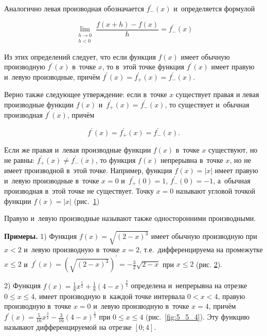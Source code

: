 Аналогично левая производная обозначается $f^\prime_{-}(x)$ и~определяется формулой

\begin{equation*}
\displaystyle \lim_{\substack{h \to 0 \\ h < 0}} \frac{f(x+h) - f(x)}{h} = f^\prime_{-}(x)
\end{equation*}

Из этих определений следует, что если функция $f(x)$ имеет обычную производную
$f^\prime (x)$ в~точке $x$, то в~этой точке функция $f^\prime (x)$ имеет
правую и~левую производные, причём $f^\prime(x) = f^\prime_{+} (x) = f^\prime_{-}(x)$.

Верно также следующее утверждение: если в~точке $x$ существует
правая и левая производные функции $f(x)$ и~$f^\prime_{+} (x) = f^\prime_{-} (x)$,
то существует и~обычная производная $f^\prime (x)$, причём 

\begin{equation*}
f^\prime(x) = f^\prime_{+} (x) = f^\prime_{-}(x).
\end{equation*}

Если же правая и~левая производные функции $f(x)$ в~точке $x$ существуют,
но не равны: $f^\prime_{+} (x) \ne f^\prime_{-}(x)$, то функция $f(x)$ непрерывна
в~точке $x$, но не имеет производной в~этой точке.
Например, функция $f(x) = |x|$ имеет правую и~левую производные в~точке $x = 0$
и~$f^\prime_{+} (0) = 1$, $f^\prime_{-} (0) = -1$, а~обычная производная
в~этой точке не существует. Точку $x = 0$ называют угловой точкой функции
$f(x) = |x|$ (рис.\ \ref{fig:5_5_2})

\begin{figure}\label{fig:5_5_2}
\end{figure}

Правую и~левую производные называют также односторонними производными.

\textbf{Примеры.}
1) Функция $f(x) = \sqrt{(2 - x)^{3}}$ имеет обычную производную при $x < 2$
и~левую производную в~точке $x = 2$, т.е.\ дифференцируема на промежутке $x \leqslant 2$
и~$\displaystyle f^\prime (x) = \left( \sqrt{(2-x)^{3}} \right)^\prime = -\frac{3}{2}\sqrt{2 - x}$
при $x \leqslant 2$ (рис. \ref{fig:5_5_3}).

\begin{figure}\label{fig:5_5_3}
\end{figure}

2) Функция $\displaystyle f(x) = \frac{1}{8}x^{\frac{5}{2}} + \frac{1}{8}(4 - x)^{\frac{3}{2}}$
определена и~непрерывна на отрезке $0 \leqslant x \leqslant 4$,
имеет производную в~каждой точке интервала $0 < x < 4$, правую производную в~точке $x = 0$
и~левую производную в~точке $x = 4$,
причём
$\displaystyle f^\prime (x) = \frac{5}{16}x^{\frac{3}{2}} - \frac{3}{16}(4 - x)^{\frac{1}{2}}$
при $0 \leqslant x \leqslant 4$ (рис.\ \ref{fig:5_5_4}).
Эту функцию называют дифференцируемой на отрезке $[0; 4]$.

